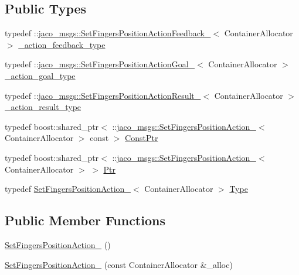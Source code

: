 \subsection*{Public Types}
\begin{DoxyCompactItemize}
\item 
typedef \+::\hyperlink{structjaco__msgs_1_1SetFingersPositionActionFeedback__}{jaco\+\_\+msgs\+::\+Set\+Fingers\+Position\+Action\+Feedback\+\_\+}$<$ Container\+Allocator $>$ \hyperlink{structjaco__msgs_1_1SetFingersPositionAction___a54563ee7e767db8e6268b91ef39d5cb6}{\+\_\+action\+\_\+feedback\+\_\+type}
\item 
typedef \+::\hyperlink{structjaco__msgs_1_1SetFingersPositionActionGoal__}{jaco\+\_\+msgs\+::\+Set\+Fingers\+Position\+Action\+Goal\+\_\+}$<$ Container\+Allocator $>$ \hyperlink{structjaco__msgs_1_1SetFingersPositionAction___a37902d96f4f497c90f453085f9f8d9d8}{\+\_\+action\+\_\+goal\+\_\+type}
\item 
typedef \+::\hyperlink{structjaco__msgs_1_1SetFingersPositionActionResult__}{jaco\+\_\+msgs\+::\+Set\+Fingers\+Position\+Action\+Result\+\_\+}$<$ Container\+Allocator $>$ \hyperlink{structjaco__msgs_1_1SetFingersPositionAction___ab486a84dee9108af1e1b18fdd3c19bb2}{\+\_\+action\+\_\+result\+\_\+type}
\item 
typedef boost\+::shared\+\_\+ptr$<$ \+::\hyperlink{structjaco__msgs_1_1SetFingersPositionAction__}{jaco\+\_\+msgs\+::\+Set\+Fingers\+Position\+Action\+\_\+}$<$ Container\+Allocator $>$ const  $>$ \hyperlink{structjaco__msgs_1_1SetFingersPositionAction___a96e6f9cedc0f5b6829fb6bd0c18249a7}{Const\+Ptr}
\item 
typedef boost\+::shared\+\_\+ptr$<$ \+::\hyperlink{structjaco__msgs_1_1SetFingersPositionAction__}{jaco\+\_\+msgs\+::\+Set\+Fingers\+Position\+Action\+\_\+}$<$ Container\+Allocator $>$ $>$ \hyperlink{structjaco__msgs_1_1SetFingersPositionAction___a52cbdae3469a8869ce75be3d47ded03d}{Ptr}
\item 
typedef \hyperlink{structjaco__msgs_1_1SetFingersPositionAction__}{Set\+Fingers\+Position\+Action\+\_\+}$<$ Container\+Allocator $>$ \hyperlink{structjaco__msgs_1_1SetFingersPositionAction___aec7f755e153f8eb967222c3617a00e27}{Type}
\end{DoxyCompactItemize}
\subsection*{Public Member Functions}
\begin{DoxyCompactItemize}
\item 
\hyperlink{structjaco__msgs_1_1SetFingersPositionAction___a96780a5859e986fd6abff83951e2160f}{Set\+Fingers\+Position\+Action\+\_\+} ()
\item 
\hyperlink{structjaco__msgs_1_1SetFingersPositionAction___a01019bfbba261e45df229d722ac60782}{Set\+Fingers\+Position\+Action\+\_\+} (const Container\+Allocator \&\+\_\+alloc)
\end{DoxyCompactItemize}
